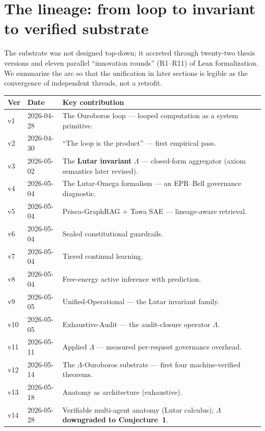 \documentclass[11pt]{article}
\theoremstyle{plain}
\theoremstyle{definition}
\theoremstyle{remark}
\newcommand{\La}{\Lambda}
\begin{document}
\section{The lineage: from loop to invariant to verified substrate}
\label{sec:lineage}

The substrate was not designed top-down; it accreted through twenty-two thesis
versions and eleven parallel ``innovation rounds'' (R1--R11) of Lean
formalization. We summarize the arc so that the unification in later sections is
legible as the convergence of independent threads, not a retrofit.

\begin{longtable}{@{}p{}p{}p{}@{}}
\toprule
\textbf{Ver} & \textbf{Date} & \textbf{Key contribution} \\
\midrule
\endhead
v1  & 2026-04-28 & The Ouroboros loop --- looped computation as a system primitive. \\
v2  & 2026-04-30 & ``The loop is the product'' --- first empirical pass. \\
v3  & 2026-05-02 & The \textbf{Lutar invariant} $\La$ --- closed-form aggregator (axiom semantics later revised). \\
v4  & 2026-05-04 & The Lutar-Omega formalism --- an EPR--Bell governance diagnostic. \\
v5  & 2026-05-04 & Prisca-GraphRAG + Tawa SAE --- lineage-aware retrieval. \\
v6  & 2026-05-04 & Sealed constitutional guardrails. \\
v7  & 2026-05-04 & Tiered continual learning. \\
v8  & 2026-05-04 & Free-energy active inference with prediction. \\
v9  & 2026-05-05 & Unified-Operational --- the Lutar invariant family. \\
v10 & 2026-05-05 & Exhaustive-Audit --- the audit-closure operator $\La$. \\
v11 & 2026-05-11 & Applied $\La$ --- measured per-request governance overhead. \\
v12 & 2026-05-14 & The $\La$-Ouroboros substrate --- first four machine-verified theorems. \\
v13 & 2026-05-18 & Anatomy as architecture (exhaustive). \\
v14 & 2026-05-28 & Verifiable multi-agent anatomy (Lutar calculus); \textbf{$\La$ downgraded to Conjecture~1}. \\

\end{longtable}
\end{document}
